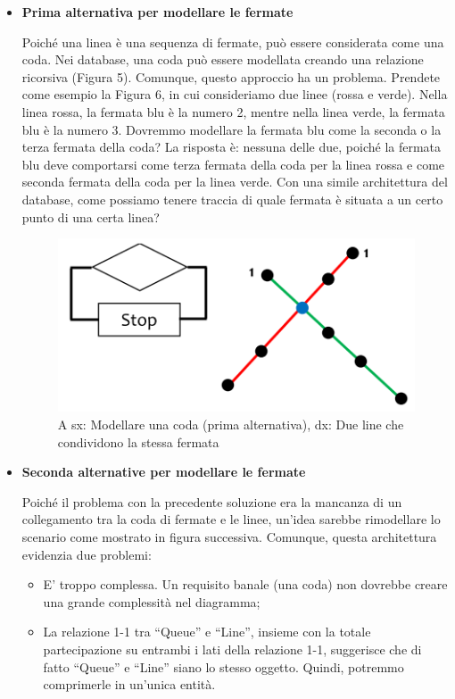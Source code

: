 \begin{itemize}

\item{\textbf{Prima alternativa per modellare le fermate}}

Poiché una linea è una sequenza di fermate, può essere considerata come una coda. Nei database, una coda può essere modellata creando una relazione ricorsiva (Figura 5). Comunque, questo approccio ha un problema. Prendete come esempio la Figura 6, in cui consideriamo due linee (rossa e verde). Nella linea rossa, la fermata blu è la numero 2, mentre nella linea verde, la fermata blu è la numero 3. Dovremmo modellare la fermata blu come la seconda o la terza fermata della coda? La risposta è: nessuna delle due, poiché la fermata blu deve comportarsi come terza fermata della coda per la linea rossa e come seconda fermata della coda per la linea verde. Con una simile architettura del database, come possiamo tenere traccia di quale fermata è situata a un certo punto di una certa linea? 

\begin{center}
\begin{figure}[H]
\centering
\includegraphics[scale=1]{figures/queue_stop.png}
\caption{A sx: Modellare una coda (prima alternativa), dx: Due line che condividono la stessa fermata} 
\end{figure}
\end{center}

\item{\textbf{Seconda alternative per modellare le fermate}}

Poiché il problema con la precedente soluzione era la mancanza di un collegamento tra la coda di fermate e le linee, un’idea sarebbe rimodellare lo scenario come mostrato in figura successiva. Comunque, questa architettura evidenzia due problemi: 

\begin{itemize}

\item E’ troppo complessa. Un requisito banale (una coda) non dovrebbe creare una grande complessità nel diagramma;
\item La relazione 1-1 tra “Queue” e “Line”, insieme con la totale partecipazione su entrambi i lati della relazione 1-1, suggerisce che di fatto “Queue” e “Line” siano lo stesso oggetto. Quindi, potremmo comprimerle in un’unica entità.   


\end{itemize}
\end{itemize}
